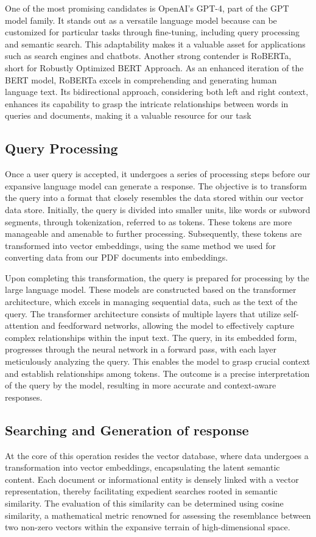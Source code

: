 \documentclass[conference]{IEEEtran}
\begin{document}
One of the most promising candidates is OpenAI's GPT-4, part of the GPT model family. It stands out as a versatile language model because can be customized for particular tasks through fine-tuning, including query processing and semantic search. This adaptability makes it a valuable asset for applications such as search engines and chatbots. Another strong contender is RoBERTa, short for Robustly Optimized BERT Approach. As an enhanced iteration of the BERT model, RoBERTa excels in comprehending and generating human language text. Its bidirectional approach, considering both left and right context, enhances its capability to grasp the intricate relationships between words in queries and documents, making it a valuable resource for our task

\subsection{Query Processing}
Once a user query is accepted, it undergoes a series of processing steps before our expansive language model can generate a response. The objective is to transform the query into a format that closely resembles the data stored within our vector data store. Initially, the query is divided into smaller units, like words or subword segments, through tokenization, referred to as tokens. These tokens are more manageable and amenable to further processing. Subsequently, these tokens are transformed into vector embeddings, using the same method we used for  converting data from our PDF documents into embeddings.

Upon completing this transformation, the query is prepared for processing by the large language model. These models are constructed based on the transformer architecture, which excels in managing sequential data, such as the text of the query. The transformer architecture consists of multiple layers that utilize self-attention and feedforward networks, allowing the model to effectively capture complex relationships within the input text. The query, in its embedded form, progresses through the neural network in a forward pass, with each layer meticulously analyzing the query. This enables the model to grasp crucial context and establish relationships among tokens. The outcome is a precise interpretation of the query by the model, resulting in more accurate and context-aware responses.

\subsection{Searching and Generation of response}
At the core of this operation resides the vector database, where data undergoes a transformation into vector embeddings, encapsulating the latent semantic content. Each document or informational entity is densely linked with a vector representation, thereby facilitating expedient searches rooted in semantic similarity. The evaluation of this similarity can be determined using cosine similarity, a mathematical metric renowned for assessing the resemblance between two non-zero vectors within the expansive terrain of high-dimensional space.
\end{document}
